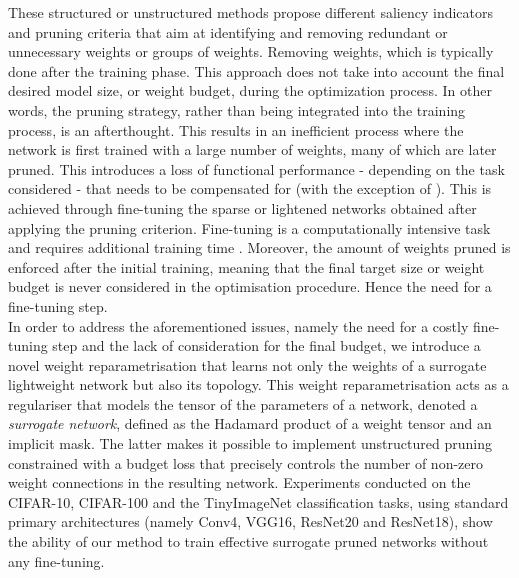 These structured or unstructured methods propose different saliency indicators
and pruning criteria that aim at identifying and removing redundant or
unnecessary weights or groups of weights. Removing weights, which is typically
done after the training phase. This approach does not take into account the
final desired model size, or weight budget, during the optimization process. In
other words, the pruning strategy, rather than being integrated into the
training process, is an afterthought. This results in an inefficient process
where the network is first trained with a large number of weights, many of which
are later pruned. This introduces a loss of functional performance - depending on
the task considered - that needs to be compensated for (with the exception of
\cite{DBLP:conf/icml/KangH20}). This is achieved through fine-tuning the sparse
or lightened networks obtained after applying the pruning criterion. Fine-tuning
is a computationally intensive task and requires additional training time
\cite{DBLP:conf/nips/HanPTD15,DBLP:journals/corr/HanMD15}. Moreover, the amount
of weights pruned is enforced after the initial training, meaning that the final
target size or weight budget is never considered in the optimisation procedure.
Hence the need for a fine-tuning step. \\


In order to address the aforementioned issues, namely the need for a costly
fine-tuning step and the lack of consideration for the final budget, we
introduce a novel weight reparametrisation that learns not only the weights of a
surrogate lightweight network but also its topology. This weight
reparametrisation acts as a regulariser that models the tensor of the parameters
of a network, denoted a \textit{surrogate network}, defined as the Hadamard
product of a weight tensor and an implicit mask. The latter makes it possible to
implement unstructured pruning constrained with a budget loss that precisely
controls the number of non-zero weight connections in the resulting network.
Experiments conducted on the CIFAR-10, CIFAR-100 and the TinyImageNet
classification tasks, using standard primary architectures (namely Conv4, VGG16,
ResNet20 and ResNet18), show the ability of our method to train effective
surrogate pruned networks without any fine-tuning.


